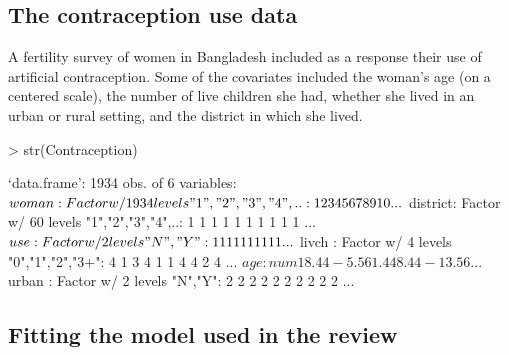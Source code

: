 \documentclass[12pt]{article}
\begin{document}
\subsection{The contraception use data }
\label{sec:Contraception}

A fertility survey of women in Bangladesh included as a response their
use of artificial contraception.  Some of the covariates included the
woman's age (on a centered scale), the number of live children she
had, whether she lived in an urban or rural setting, and the district
in which she lived.
\begin{Schunk}
\begin{Sinput}
> str(Contraception)
\end{Sinput}
\begin{Soutput}
`data.frame':	1934 obs. of  6 variables:
 $ woman   : Factor w/ 1934 levels "1","2","3","4",..: 1 2 3 4 5 6 7 8 9 10 ...
 $ district: Factor w/ 60 levels "1","2","3","4",..: 1 1 1 1 1 1 1 1 1 1 ...
 $ use     : Factor w/ 2 levels "N","Y": 1 1 1 1 1 1 1 1 1 1 ...
 $ livch   : Factor w/ 4 levels "0","1","2","3+": 4 1 3 4 1 1 4 4 2 4 ...
 $ age     : num   18.44  -5.56   1.44   8.44 -13.56 ...
 $ urban   : Factor w/ 2 levels "N","Y": 2 2 2 2 2 2 2 2 2 2 ...
\end{Soutput}
\end{Schunk}


\subsection{Fitting the model used in the review}
\label{sec:Reviewmodel}
\end{document}
